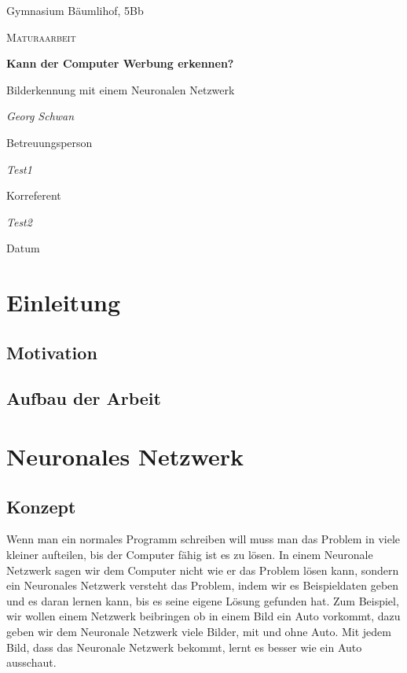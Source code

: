 \documentclass[12pt,a4paper]{report}
\begin{document}
\begin{titlepage}
	\centering
	{\Large Gymnasium Bäumlihof, 5Bb \par}
	\vspace{1cm}
	{\LARGE\scshape Maturaarbeit\par}
	\vspace{1.5cm}
	{\huge\bfseries Kann der Computer Werbung erkennen?\par}
	\vspace{0.6cm}
    {\Large Bilderkennung mit einem Neuronalen Netzwerk\par}
	\vspace{2cm}
	{\Large\itshape Georg Schwan\par}
	\vfill
	Betreuungsperson\par
	{\itshape Test1\par}
	Korreferent\par
	{\itshape Test2}
	\vfill
	{\large Datum\par}
\end{titlepage}

\tableofcontents

\newpage

\chapter{Einleitung}\label{ch:einleitung}

\section{Motivation}
\label{sec:motivation}

\section{Aufbau der Arbeit}
\label{sec:aufbauDerArbeit}

\chapter{Neuronales Netzwerk}
\label{ch:neuronalesNetzwerk}

\section{Konzept}\label{sec:konzept}
Wenn man ein normales Programm schreiben will muss man das Problem in viele kleiner aufteilen, bis der Computer fähig ist
es zu lösen.
In einem Neuronale Netzwerk sagen wir dem Computer nicht wie er das Problem lösen kann, sondern ein Neuronales Netzwerk
versteht das Problem, indem wir es Beispieldaten geben und es daran lernen kann, bis es seine eigene Lösung gefunden hat.
Zum Beispiel, wir wollen einem Netzwerk beibringen ob in einem Bild ein Auto vorkommt,
dazu geben wir dem Neuronale Netzwerk viele Bilder, mit und ohne Auto.
Mit jedem Bild, dass das Neuronale Netzwerk bekommt, lernt es besser wie ein Auto ausschaut.
\end{document}
